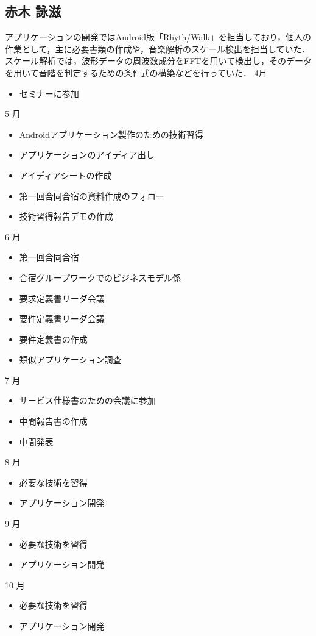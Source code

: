 \subsection{赤木 詠滋}
アプリケーションの開発ではAndroid版「Rhyth/Walk」を担当しており，個人の作業として，主に必要書類の作成や，音楽解析のスケール検出を担当していた．スケール解析では，波形データの周波数成分をFFTを用いて検出し，そのデータを用いて音階を判定するための条件式の構築などを行っていた．
4月
\begin{itemize}
\item セミナーに参加
\end{itemize}
5 月
\begin{itemize}
\item Androidアプリケーション製作のための技術習得
\item アプリケーションのアイディア出し
\item アイディアシートの作成
\item 第一回合同合宿の資料作成のフォロー
\item 技術習得報告デモの作成
\end{itemize}
6 月
\begin{itemize}
\item 第一回合同合宿
\item 合宿グループワークでのビジネスモデル係
\item 要求定義書リーダ会議
\item 要件定義書リーダ会議
\item 要件定義書の作成
\item 類似アプリケーション調査
\end{itemize}
7 月
\begin{itemize}
\item サービス仕様書のための会議に参加
\item 中間報告書の作成
\item 中間発表
\end{itemize}
8 月
\begin{itemize}
\item 必要な技術を習得
\item アプリケーション開発
\end{itemize}
9 月
\begin{itemize}
\item 必要な技術を習得
\item アプリケーション開発
\end{itemize}
10 月
\begin{itemize}
\item 必要な技術を習得
\item アプリケーション開発
\end{itemize}
